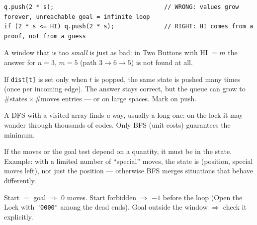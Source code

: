 \begin{warningbox}
\begin{lstlisting}[style=snippet]
q.push(2 * s);                               // WRONG: values grow forever, unreachable goal = infinite loop
if (2 * s <= HI) q.push(2 * s);              // RIGHT: HI comes from a proof, not from a guess
\end{lstlisting}
A window that is too \emph{small} is just as bad: in Two Buttons with HI $= m$ the answer for $n=3$, $m=5$ (path $3\to6\to5$) is not found at all.
\end{warningbox}

\begin{warningbox}
If \texttt{dist[t]} is set only when $t$ is popped, the same state is pushed many times (once per incoming edge). The answer stays correct, but the queue can grow to $\#\text{states}\times\#\text{moves}$ entries --- \mle{} or \tle{} on large spaces. Mark on push.
\end{warningbox}

\begin{warningbox}
A DFS with a visited array finds \emph{a} way, usually a long one: on the lock it may wander through thousands of codes. Only BFS (unit costs) guarantees the minimum.
\end{warningbox}

\begin{warningbox}
If the moves or the goal test depend on a quantity, it must be in the state. Example: with a limited number of ``special'' moves, the state is (position, special moves left), not just the position --- otherwise BFS merges situations that behave differently.
\end{warningbox}

\begin{warningbox}
Start $=$ goal $\Rightarrow$ 0 moves. Start forbidden $\Rightarrow$ $-1$ before the loop (Open the Lock with \texttt{"0000"} among the dead ends). Goal outside the window $\Rightarrow$ check it explicitly.
\end{warningbox}

